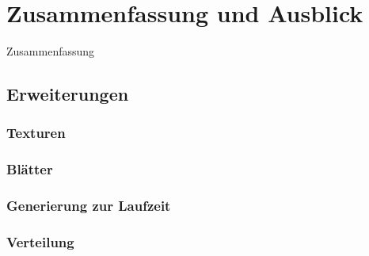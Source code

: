 \chapter{Zusammenfassung und Ausblick}

Zusammenfassung

\section{Erweiterungen}

\subsection{Texturen}

\subsection{Blätter}

\subsection{Generierung zur Laufzeit}

\subsection{Verteilung}